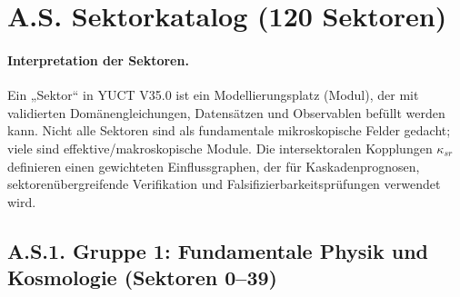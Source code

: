 \documentclass[13pt,a4paper]{article}
\begin{document}
	\section*{A.S. Sektorkatalog (120 Sektoren)}
	\label{sec:sector-catalog}
	\paragraph{Interpretation der Sektoren.}
	Ein „Sektor“ in YUCT V35.0 ist ein Modellierungsplatz (Modul), der mit validierten Domänengleichungen, Datensätzen und Observablen befüllt werden kann. Nicht alle Sektoren sind als fundamentale mikroskopische Felder gedacht; viele sind effektive/makroskopische Module. Die intersektoralen Kopplungen $\kappa_{sr}$ definieren einen gewichteten Einflussgraphen, der für Kaskadenprognosen, sektorenübergreifende Verifikation und Falsifizierbarkeitsprüfungen verwendet wird.
	
	\subsection*{A.S.1. Gruppe 1: Fundamentale Physik und Kosmologie (Sektoren 0--39)}
	
\end{document}
